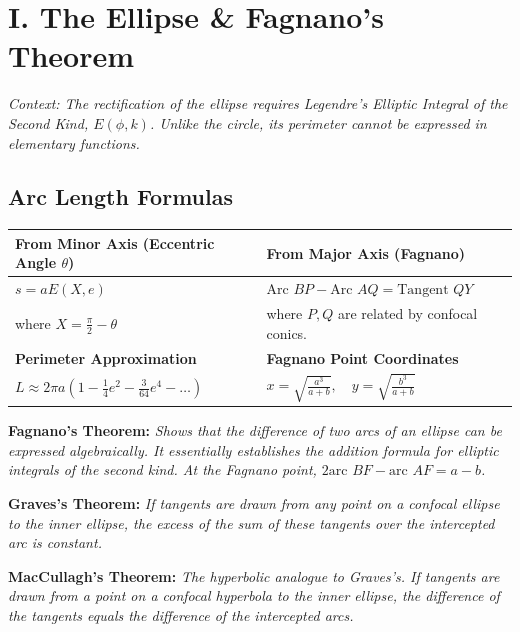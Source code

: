\documentclass[11pt, a4paper]{article}
\begin{document}
\section*{\color{primary} I. The Ellipse \& Fagnano's Theorem}

\textit{\small Context: The rectification of the ellipse requires Legendre's Elliptic Integral of the Second Kind, $E(\phi, k)$. Unlike the circle, its perimeter cannot be expressed in elementary functions.}

\subsection*{\color{secondary} Arc Length Formulas}
\begin{center}
\begin{tabular}{@{}p{} p{}@{}}
\toprule
\textbf{From Minor Axis (Eccentric Angle $\theta$)} & \textbf{From Major Axis (Fagnano)} \\
\midrule
$s = a E(X, e)$ & $\text{Arc } BP - \text{Arc } AQ = \text{Tangent } QY$ \\
where $X = \frac{\pi}{2} - \theta$ & where $P, Q$ are related by confocal conics. \\
\midrule
\textbf{Perimeter Approximation} & \textbf{Fagnano Point Coordinates} \\
\midrule
$L \approx 2\pi a \left( 1 - \frac{1}{4}e^2 - \frac{3}{64}e^4 - \dots \right)$ & $x = \sqrt{\frac{a^3}{a+b}}, \quad y = \sqrt{\frac{b^3}{a+b}}$ \\
\bottomrule
\end{tabular}
\end{center}

\vspace{0.2cm}

\textbf{\color{accent}Fagnano's Theorem:} \textit{\small Shows that the difference of two arcs of an ellipse can be expressed algebraically. It essentially establishes the addition formula for elliptic integrals of the second kind. At the Fagnano point, $2 \text{arc } BF - \text{arc } AF = a - b$.}

\textbf{\color{accent}Graves's Theorem:} \textit{\small If tangents are drawn from any point on a confocal ellipse to the inner ellipse, the excess of the sum of these tangents over the intercepted arc is constant.}

\textbf{\color{accent}MacCullagh's Theorem:} \textit{\small The hyperbolic analogue to Graves's. If tangents are drawn from a point on a confocal hyperbola to the inner ellipse, the difference of the tangents equals the difference of the intercepted arcs.}
\end{document}
